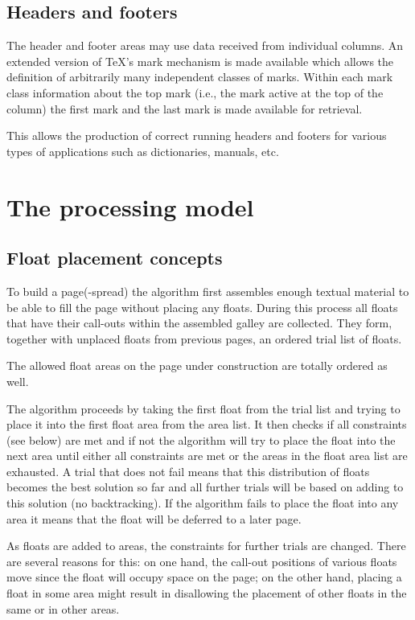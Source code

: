 \documentclass[twocolumn]{article}
\begin{document}
\subsection{Headers and footers}

The header and footer areas may use data received from individual
columns. An extended version of \TeX's mark mechanism is made
available which allows the definition of arbitrarily many independent
classes of marks. Within each mark class information about the top
mark (i.e., the mark active at the top of the column) the first mark
and the last mark is made available for retrieval.

This allows the production of correct running headers and footers for
various types of applications such as dictionaries, manuals, etc.



\section{The processing model}

\subsection{Float placement concepts}\label{sec:float-place}

To build a page(-spread) the algorithm first assembles enough textual
material to be able to fill the page without placing any floats.
During this process all floats that have their call-outs within the
assembled galley are collected. They form, together with unplaced
floats from previous pages, an ordered trial list of floats.

The allowed float areas on the page under construction are totally
ordered as well.

The algorithm proceeds by taking the first float from the trial list
and trying to place it into the first float area from the area
list. It then checks if all constraints (see below) are met and if not
the algorithm
will try to place the float into the next area until either all
constraints are met or the areas in the float area list are exhausted.
A trial that does not fail means that
this distribution of floats becomes the best solution so far and all
further trials will be based on adding to this solution (no
backtracking). If the algorithm fails to place the float into any
area it means that the float will be deferred to a later page.

As floats are added to areas, the constraints for further trials 
are changed. There are several reasons for this:
on one hand, the call-out positions of
various floats move
since the float will occupy space on the page; on the other hand,
placing a float in some area might result in disallowing the placement
of other floats in the same or in other areas.
\end{document}
